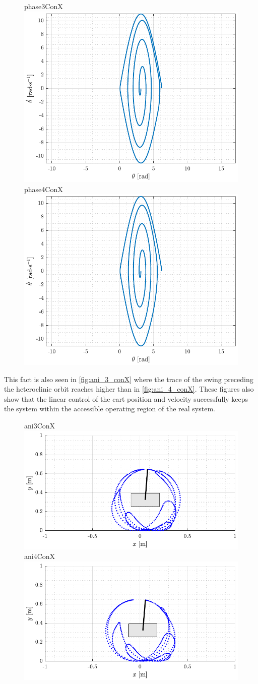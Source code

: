 \begin{figure}[H]
  \hspace{-10pt}
  \captionbox
  {
    phase3ConX
    \label{fig:phase_3_conX}
  }
  {
    \hspace{-1cm}
    \includegraphics[width=.46\textwidth]{figures/phase_3_conX}
  }
  \hspace{20pt}
  \captionbox 
  {
    phase4ConX
    \label{fig:phase_4_conX}
  }
  {
    \hspace{-1cm}
    \includegraphics[width=.46\textwidth]{figures/phase_4_conX}
  }  
\end{figure}
%
This fact is also seen in \autoref{fig:ani_3_conX} where the trace of the swing preceding the heteroclinic orbit reaches higher than in \autoref{fig:ani_4_conX}. These figures also show that the linear control of the cart position and velocity successfully keeps the system within the accessible operating region of the real system.
%
\begin{figure}[H]
  \hspace{-10pt}
  \captionbox
  {
    ani3ConX
    \label{fig:ani_3_conX}
  }
  {
    \hspace{-1cm}
    \includegraphics[width=.46\textwidth]{figures/ani_3_conX}
  }
  \hspace{20pt}
  \captionbox 
  {
    ani4ConX
    \label{fig:ani_4_conX}
  }
  {
    \hspace{-1cm}
    \includegraphics[width=.46\textwidth]{figures/ani_4_conX}
  }  
\end{figure}
